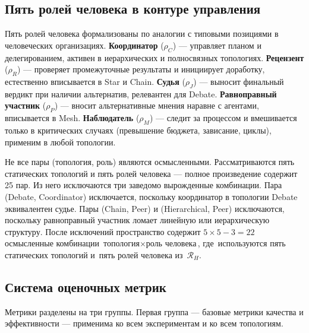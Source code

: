 \subsection{Пять ролей человека в контуре управления}
\label{sec:meth:roles}

Пять ролей человека формализованы по аналогии с типовыми позициями
в человеческих организациях. \textbf{Координатор} ($\rho_C$) ---
управляет планом и делегированием, активен в иерархических и
полносвязных топологиях. \textbf{Рецензент} ($\rho_R$) --- проверяет
промежуточные результаты и инициирует доработку, естественно
вписывается в Star и Chain. \textbf{Судья} ($\rho_J$) ---
выносит финальный вердикт при наличии альтернатив, релевантен
для Debate. \textbf{Равноправный участник} ($\rho_P$) ---
вносит альтернативные мнения наравне с агентами, вписывается
в Mesh. \textbf{Наблюдатель} ($\rho_M$) --- следит за процессом
и вмешивается только в критических случаях (превышение бюджета,
зависание, циклы), применим в любой топологии.

Не все пары (топология, роль) являются осмысленными.
Рассматриваются пять статических топологий и пять ролей человека ---
полное произведение содержит 25 пар. Из него исключаются три
заведомо вырожденные комбинации. Пара (Debate, Coordinator)
исключается, поскольку координатор в топологии Debate
эквивалентен судье. Пары (Chain, Peer) и (Hierarchical, Peer)
исключаются, поскольку равноправный участник ломает линейную или
иерархическую структуру. После исключений пространство содержит
$5 \times 5 - 3 = 22$ осмысленные комбинации
$\text{топология} \times \text{роль человека}$, где~используются
пять статических топологий и~пять ролей человека из~$\mathcal{R}_H$.

\subsection{Система оценочных метрик}
\label{sec:meth:metrics}

Метрики разделены на три группы. Первая группа --- базовые метрики
качества и эффективности --- применима ко всем экспериментам и
ко всем топологиям.

